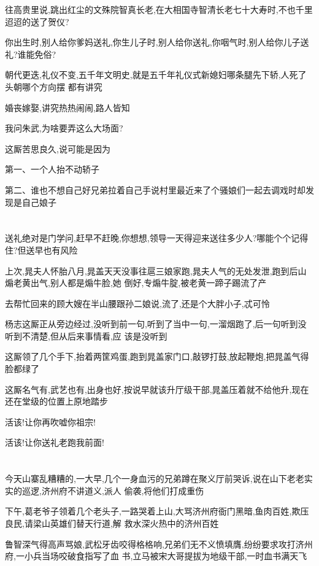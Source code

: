 ﻿\documentclass[12pt]{article}
\begin{document}
往高贵里说,跳出红尘的文殊院智真长老,在大相国寺智清长老七十大寿时,不也千里迢迢的送了贺仪?

你出生时,别人给你爹妈送礼,你生儿子时,别人给你送礼,你咽气时,别人给你儿子送礼?谁能免俗?

朝代更迭,礼仪不变,五千年文明史,就是五千年礼仪式\dldots 新媳妇哪条腿先下轿,人死了头朝哪个方向摆\dldots
都有讲究

婚丧嫁娶,讲究热热闹闹,路人皆知

我问朱武,为啥要弄这么大场面?

这厮苦思良久,说可能是因为

第一、一个人抬不动轿子

第二、谁也不想自己好兄弟拉着自己手说村里最近来了个骚娘们一起去调戏时却发现是自己娘子

\section{}

送礼绝对是门学问,赶早不赶晚,你想想,领导一天得迎来送往多少人?哪能个个记得住?但送早也有风险

上次,晁夫人怀胎八月,晁盖天天没事往扈三娘家跑,晁夫人气的无处发泄,跑到后山煽老黄出气,别人都是煽牛脸,她
倒好,专煽牛腚,被老黄一蹄子踢流了产

去帮忙回来的顾大嫂在半山腰跟孙二娘说,流了,还是个大胖小子,忒可怜

杨志这厮正从旁边经过,没听到前一句,听到了当中一句,一溜烟跑了,后一句听到没听到不清楚,但从后来事情看,应
该是没听到

这厮领了几个手下,抬着两筐鸡蛋,跑到晁盖家门口,敲锣打鼓,放起鞭炮,把晁盖气得脸都绿了

这厮名气有,武艺也有,出身也好,按说早就该升厅级干部,晁盖压着就不给他升,现在还在堂级的位置上原地踏步

活该!让你再吹嘘你祖宗!

活该!让你送礼老跑我前面!
\section{}

今天山寨乱糟糟的,一大早,几个一身血污的兄弟蹲在聚义厅前哭诉,说在山下老老实实的巡逻,济州府不讲道义,派人
偷袭,将他们打成重伤\dldots

下午,葛老爷子领着几个老头子,一路哭着上山,大骂济州府衙门黑暗,鱼肉百姓,欺压良民,请梁山英雄们替天行道,解
救水深火热中的济州百姓\dldots

鲁智深气得高声骂娘,武松牙齿咬得格格响,兄弟们无不义愤填膺,纷纷要求攻打济州府,一小兵当场咬破食指写了血
书,立马被宋大哥提拔为地级干部,一时血书满天飞\dldots
\end{document}
